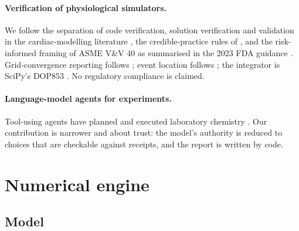 \documentclass[11pt,letterpaper]{article}
\begin{document}
\paragraph{Verification of physiological simulators.} We follow the separation of code verification, solution verification and validation in the cardiac-modelling literature \citep{pathmanathan2013reliability,pathmanathan2014verification}, the credible-practice rules of \citet{erdemir2020credible}, and the risk-informed framing of ASME V\&V 40 \citep{asme2018vv40} as summarised in the 2023 FDA guidance \citep{fda2023credibility}. Grid-convergence reporting follows \citet{roache1994gci}; event location follows \citet{shampine2000event}; the integrator is SciPy's DOP853 \citep{hairer1993,virtanen2020scipy}. No regulatory compliance is claimed.

\paragraph{Language-model agents for experiments.} Tool-using agents have planned and executed laboratory chemistry \citep{boiko2023autonomous,bran2024chemcrow}. Our contribution is narrower and about trust: the model's authority is reduced to choices that are checkable against receipts, and the report is written by code.

\section{Numerical engine}
\label{sec:engine}

\subsection{Model}
\end{document}
